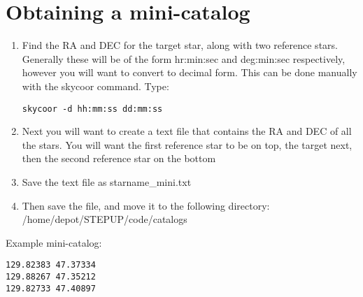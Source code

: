 \documentclass[10pt,preprint]{aastex}
\begin{document}
\section{Obtaining a mini-catalog}
\begin{enumerate}
\item Find the RA and DEC for the target star, along with two reference stars. Generally these will be of the form hr:min:sec and deg:min:sec respectively, however you will want to convert to decimal form. This can be done manually with the skycoor command. Type:
\begin{verbatim}
skycoor -d hh:mm:ss dd:mm:ss
\end{verbatim}
\item Next you will want to create a text file that contains the RA and DEC of all the stars. You will want the first reference star to be on top, the target next, then the second reference star on the bottom
\item Save the text file as starname\_mini.txt
\item Then save the file, and move it to the following directory: /home/depot/STEPUP/code/catalogs
\end{enumerate}

\noindent Example mini-catalog:
\begin{verbatim}
129.82383 47.37334
129.88267 47.35212
129.82733 47.40897
\end{verbatim}
\end{document}
